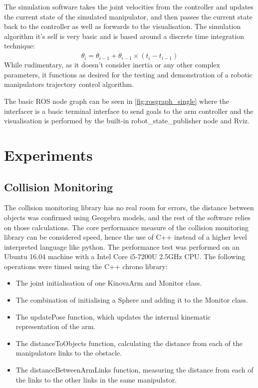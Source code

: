\documentclass[a4paper, 10pt, conference]{ieeeconf}      %
\begin{document}
The simulation software takes the joint velocities from the controller and updates the current state of the simulated manipulator, and then passes the current state back to the controller as well as forwards to the visualisation. The simulation algorithm it's self is very basic and is based around a discrete time integration technique:
$$
\theta_i = \theta_{i-1} + \dot{\theta}_{i-1}\times (t_i - t_{i-1})
$$ 
While rudimentary, as it doesn't consider inertia or any other complex parameters, it functions as desired for the testing and demonstration of a robotic manipulators trajectory control algorithm.

The basic ROS node graph can be seen in \ref{fig:rosgraph_single} where the interfacer is a basic terminal interface to send goals to the arm controller and the visualisation is performed by the built-in robot\_state\_publisher node and Rviz.


\section{Experiments}

\subsection{Collision Monitoring} %
The collision monitoring library has no real room for errors, the distance between objects was confirmed using Geogebra models, and the rest of the software relies on those calculations. The core performance measure of the collision monitoring library can be considered speed, hence the use of C++ instead of a higher level interpreted language like python. The performance test was performed on an Ubuntu 16.04 machine with a Intel Core i5-7200U 2.5GHz CPU. The following operations were timed using the C++ chrono library:
\begin{itemize}
	\item The joint initialisation of one KinovaArm and Monitor class.
	\item The combination of initialising a Sphere and adding it to the Monitor class.
	\item The updatePose function, which updates the internal kinematic representation of the arm.
	\item The distanceToObjects function, calculating the distance from each of the manipulators links to the obstacle.
	\item The distanceBetweenArmLinks function, measuring the distance from each of the links to the other links in the same manipulator.
\end{itemize}
\end{document}
